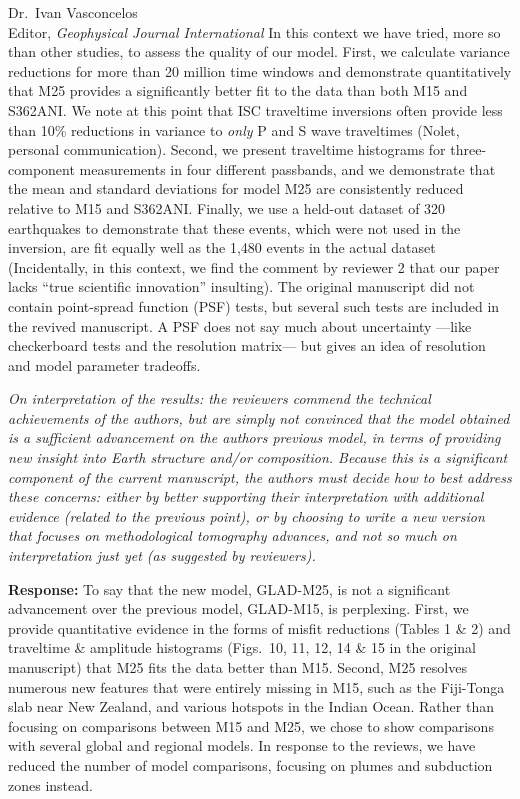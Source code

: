 \documentclass[11pt,a4paper]{letter}
\newcommand{\response}[1]{\textbf{Response:} #1}
\newcommand{\rev}[1]{{\it{#1}}}
\begin{document}
\begin{letter}{Dr.~Ivan Vasconcelos\\
Editor, \textit{Geophysical Journal International}}
{In this context we have tried, more so than other studies, to assess the quality of our model.
First, we calculate variance reductions for more than 20 million time windows and demonstrate quantitatively that M25 provides a significantly better fit to the data than both M15 and S362ANI.
We note at this point that ISC traveltime inversions often provide less than 10\% reductions in variance to \emph{only} P and S wave traveltimes (Nolet, personal communication).
Second, we present traveltime histograms for three-component measurements in four different passbands, and we demonstrate that the mean and standard deviations for model M25 are consistently reduced relative to M15 and S362ANI.
Finally, we use a held-out dataset of 320 earthquakes to demonstrate that these events, which were not used in the inversion, are fit equally well as the 1,480 events in the actual dataset (Incidentally, in this context, we find the comment by reviewer 2 that our paper lacks ``true scientific innovation'' insulting).
The original manuscript did not contain point-spread function (PSF) tests,
but several such tests are included in the revived manuscript.
A PSF does not say much about uncertainty ---like checkerboard tests and the resolution matrix--- but gives an idea of resolution and model parameter tradeoffs.
}

\rev{On interpretation of the results: the reviewers commend the technical achievements of the authors, but are simply not convinced that the model obtained is a sufficient advancement on the authors previous model, in terms of providing new insight into Earth structure and/or composition.
Because this is a significant component of the current manuscript, the authors must decide how to best address these concerns: either by better supporting their interpretation with additional evidence (related to the previous point), or by choosing to write a new version that focuses on methodological tomography advances, and not so much on interpretation just yet (as suggested by reviewers).
}

\response{To say that the new model, GLAD-M25, is not a significant advancement over the previous model, GLAD-M15, is perplexing. First, we provide quantitative evidence in the forms of misfit reductions (Tables 1 \& 2) and traveltime \& amplitude histograms (Figs.~10, 11, 12, 14 \& 15 in the original manuscript) that M25 fits the data better than M15.
Second, M25 resolves numerous new features that were entirely missing in M15, such as the Fiji-Tonga slab near New Zealand, and various hotspots in the Indian Ocean.
Rather than focusing on comparisons between M15 and M25, we chose to show comparisons with several global and regional models.
In response to the reviews,
we have reduced the number of model comparisons, focusing on plumes and subduction zones instead.
}


\end{letter}
\end{document}

